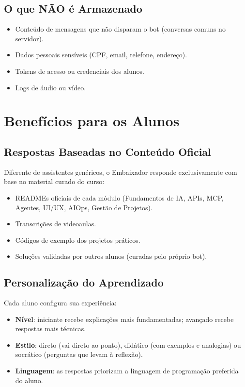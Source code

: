 \documentclass[11pt,a4paper]{article}
\begin{document}
\subsection{O que NÃO é Armazenado}

\begin{itemize}[leftmargin=1.5em, itemsep=0.3em]
  \item Conteúdo de mensagens que não disparam o bot (conversas comuns no servidor).
  \item Dados pessoais sensíveis (CPF, email, telefone, endereço).
  \item Tokens de acesso ou credenciais dos alunos.
  \item Logs de áudio ou vídeo.
\end{itemize}

\section{Benefícios para os Alunos}

\subsection{Respostas Baseadas no Conteúdo Oficial}

Diferente de assistentes genéricos, o Embaixador responde exclusivamente com base no material curado do curso:
\begin{itemize}[leftmargin=1.5em, itemsep=0.3em]
  \item READMEs oficiais de cada módulo (Fundamentos de IA, APIs, MCP, Agentes, UI/UX, AIOps, Gestão de Projetos).
  \item Transcrições de videoaulas.
  \item Códigos de exemplo dos projetos práticos.
  \item Soluções validadas por outros alunos (curadas pelo próprio bot).
\end{itemize}

\subsection{Personalização do Aprendizado}

Cada aluno configura sua experiência:
\begin{itemize}[leftmargin=1.5em, itemsep=0.3em]
  \item \textbf{Nível}: iniciante recebe explicações mais fundamentadas; avançado recebe respostas mais técnicas.
  \item \textbf{Estilo}: direto (vai direto ao ponto), didático (com exemplos e analogias) ou socrático (perguntas que levam à reflexão).
  \item \textbf{Linguagem}: as respostas priorizam a linguagem de programação preferida do aluno.
\end{itemize}
\end{document}
